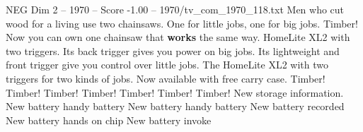 \begin{textsample}{NEG Dim 2 – 1970 – Score -1.00 – 1970/tv\_com\_1970\_118.txt}  \label{ex:f2_neg_045}
Men who cut wood for a living use two chainsaws.
One for little jobs, one for big jobs.
Timber!
Now you can own one chainsaw that \textbf{works} the same way.
HomeLite XL2 with two triggers.
Its back trigger gives you power on big jobs.
Its lightweight and front trigger give you control over little jobs.
The HomeLite XL2 with two triggers for two kinds of jobs.
Now available with free carry case.
Timber!
Timber!
Timber!
Timber!
Timber!
Timber!
Timber!
New storage information.
New battery handy battery New battery handy battery New battery recorded New battery hands on chip New battery invoke

\end{textsample}
